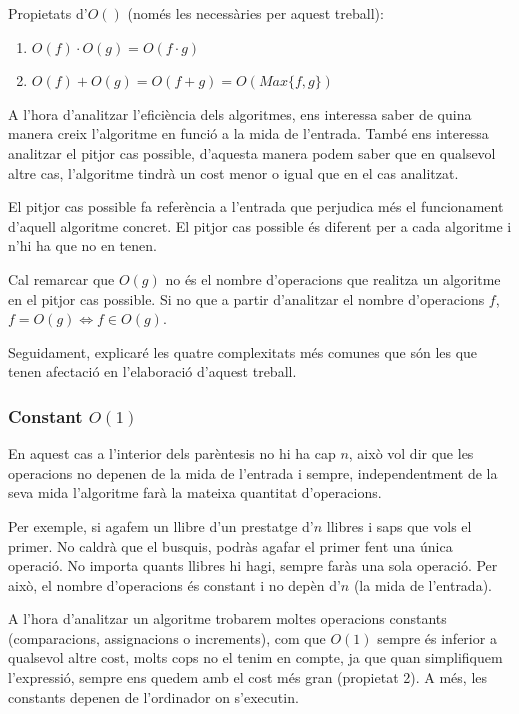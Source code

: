 Propietats d'$O()$ (només les necessàries per aquest treball):
\begin{enumerate}
    \item $O(f) \cdot O(g) = O(f \cdot g)$
    \item $O(f) + O(g) = O(f + g) = O(Max\{f,g\})$
\end{enumerate}

A l'hora d'analitzar l'eficiència dels algoritmes, ens interessa saber de quina manera creix l'algoritme en funció a la mida de l'entrada. També ens interessa analitzar el pitjor cas possible, d'aquesta manera podem saber que en qualsevol altre cas, l'algoritme tindrà un cost menor o igual que en el cas analitzat.

El pitjor cas possible fa referència a l'entrada que perjudica més el funcionament d'aquell algoritme concret. El pitjor cas possible és diferent per a cada algoritme i n'hi ha que no en tenen.

Cal remarcar que $O(g)$ no és el nombre d'operacions que realitza un algoritme en el pitjor cas possible. Si no que a partir d'analitzar el nombre d'operacions $f$, $f = O(g) \iff f \in O(g)$. 

Seguidament, explicaré les quatre complexitats més comunes que són les que tenen afectació en l'elaboració d'aquest treball.

\subsubsection*{Constant $O(1)$}
En aquest cas a l'interior dels parèntesis no hi ha cap $n$, això vol dir que les operacions no depenen de la mida de l'entrada i sempre, independentment de la seva mida l'algoritme farà la mateixa quantitat d'operacions.

Per exemple, si agafem un llibre d'un prestatge d'$n$ llibres i saps que vols el primer. No caldrà que el busquis, podràs agafar el primer fent una única operació. No importa quants llibres hi hagi, sempre faràs una sola operació. Per això, el nombre d'operacions és constant i no depèn d'$n$ (la mida de l'entrada).

A l'hora d'analitzar un algoritme trobarem moltes operacions constants (comparacions, assignacions o increments), com que $O(1)$ sempre és inferior a qualsevol altre cost, molts cops no el tenim en compte, ja que quan simplifiquem l'expressió, sempre ens quedem amb el cost més gran (propietat 2). A més, les constants depenen de l'ordinador on s'executin.

